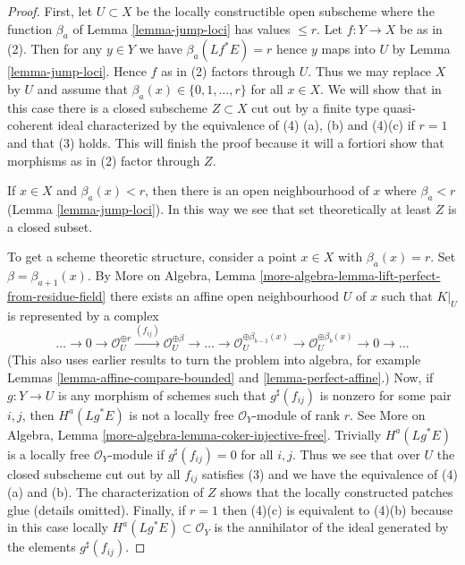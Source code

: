 \begin{proof}
First, let $U \subset X$ be the locally constructible
open subscheme where the function
$\beta_a$ of Lemma \ref{lemma-jump-loci} has values $\leq r$.
Let $f : Y \to X$ be as in (2). Then for any $y \in Y$
we have $\beta_a(Lf^*E) = r$ hence $y$ maps into $U$ by
Lemma \ref{lemma-jump-loci}. Hence $f$ as in (2) factors through $U$.
Thus we may replace $X$ by $U$ and assume that
$\beta_a(x) \in \{0, 1, \ldots, r\}$ for all $x \in X$.
We will show that in this case
there is a closed subscheme $Z \subset X$ cut out by a finite type
quasi-coherent ideal characterized
by the equivalence of (4) (a), (b) and (4)(c) if $r = 1$
and that (3) holds.
This will finish the proof because it will a fortiori show
that morphisms as in (2) factor through $Z$.

\medskip\noindent
If $x \in X$ and $\beta_a(x) < r$, then there is an
open neighbourhood of $x$ where $\beta_a < r$
(Lemma \ref{lemma-jump-loci}). In this way we
see that set theoretically at least $Z$ is a closed subset.

\medskip\noindent
To get a scheme theoretic structure, consider a point $x \in X$
with $\beta_a(x) = r$. Set $\beta = \beta_{a + 1}(x)$.
By More on Algebra, Lemma
\ref{more-algebra-lemma-lift-perfect-from-residue-field}
there exists an affine open neighbourhood $U$ of $x$
such that $K|_U$ is represented by a complex
$$
\ldots \to 0 \to \mathcal{O}_U^{\oplus r}
\xrightarrow{(f_{ij})} \mathcal{O}_U^{\oplus \beta} \to
\ldots \to
\mathcal{O}_U^{\oplus \beta_{b - 1}(x)} \to
\mathcal{O}_U^{\oplus \beta_b(x)} \to 0
\to \ldots
$$
(This also uses earlier results to turn the problem into algebra, for example
Lemmas \ref{lemma-affine-compare-bounded} and
\ref{lemma-perfect-affine}.) Now, if $g : Y \to U$ is any morphism
of schemes such that $g^\sharp(f_{ij})$ is nonzero for some pair $i, j$, then
$H^a(Lg^*E)$ is not a locally free $\mathcal{O}_Y$-module of rank $r$.
See More on Algebra, Lemma \ref{more-algebra-lemma-coker-injective-free}.
Trivially $H^a(Lg^*E)$ is a locally free $\mathcal{O}_Y$-module if
$g^\sharp(f_{ij}) = 0$ for all $i, j$. Thus we see that over $U$ the
closed subscheme cut out by all $f_{ij}$ satisfies
(3) and we have the equivalence of (4)(a) and (b).
The characterization of $Z$ shows that the locally constructed patches
glue (details omitted). Finally, if $r = 1$ then
(4)(c) is equivalent to (4)(b) because in this case locally
$H^a(Lg^*E) \subset \mathcal{O}_Y$ is the annihilator of the ideal generated
by the elements $g^\sharp(f_{ij})$.
\end{proof}





